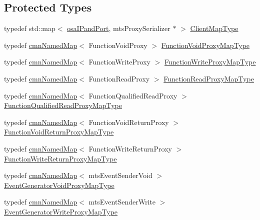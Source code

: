 \subsection*{Protected Types}
\begin{DoxyCompactItemize}
\item 
typedef std\+::map$<$ \hyperlink{structosa_i_pand_port}{osa\+I\+Pand\+Port}, mts\+Proxy\+Serializer $\ast$ $>$ \hyperlink{classmts_socket_proxy_server_a7119b8c41d2a72f7234f77bdcc1e2fad}{Client\+Map\+Type}
\item 
typedef \hyperlink{classcmn_named_map}{cmn\+Named\+Map}$<$ Function\+Void\+Proxy $>$ \hyperlink{classmts_socket_proxy_server_a6d95a7cca6e51f877454df35d3fa56ab}{Function\+Void\+Proxy\+Map\+Type}
\item 
typedef \hyperlink{classcmn_named_map}{cmn\+Named\+Map}$<$ Function\+Write\+Proxy $>$ \hyperlink{classmts_socket_proxy_server_ae84115470284d069bbd2856f4fa11e43}{Function\+Write\+Proxy\+Map\+Type}
\item 
typedef \hyperlink{classcmn_named_map}{cmn\+Named\+Map}$<$ Function\+Read\+Proxy $>$ \hyperlink{classmts_socket_proxy_server_ac02122bd068b3dc59511a47e2e733671}{Function\+Read\+Proxy\+Map\+Type}
\item 
typedef \hyperlink{classcmn_named_map}{cmn\+Named\+Map}$<$ Function\+Qualified\+Read\+Proxy $>$ \hyperlink{classmts_socket_proxy_server_ad42c455d343f85b06a2c7047739c9c7b}{Function\+Qualified\+Read\+Proxy\+Map\+Type}
\item 
typedef \hyperlink{classcmn_named_map}{cmn\+Named\+Map}$<$ Function\+Void\+Return\+Proxy $>$ \hyperlink{classmts_socket_proxy_server_a542c0cd156add7e963c92287aaf4e7f3}{Function\+Void\+Return\+Proxy\+Map\+Type}
\item 
typedef \hyperlink{classcmn_named_map}{cmn\+Named\+Map}$<$ Function\+Write\+Return\+Proxy $>$ \hyperlink{classmts_socket_proxy_server_ab8976dbfc7fa5afbb1f02e7cddc2d71d}{Function\+Write\+Return\+Proxy\+Map\+Type}
\item 
typedef \hyperlink{classcmn_named_map}{cmn\+Named\+Map}$<$ mts\+Event\+Sender\+Void $>$ \hyperlink{classmts_socket_proxy_server_ae784ef6005901f988064e99f28bc4dc4}{Event\+Generator\+Void\+Proxy\+Map\+Type}
\item 
typedef \hyperlink{classcmn_named_map}{cmn\+Named\+Map}$<$ mts\+Event\+Sender\+Write $>$ \hyperlink{classmts_socket_proxy_server_a54071862784d4a4b6b75588e5c03df14}{Event\+Generator\+Write\+Proxy\+Map\+Type}
\end{DoxyCompactItemize}
